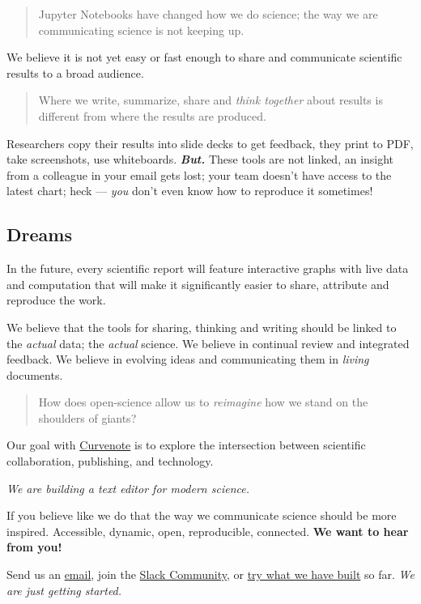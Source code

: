 \begin{quote}
  Jupyter Notebooks have changed how we do science; the way we are communicating science is not keeping up.
\end{quote}

We believe it is not yet easy or fast enough to share and communicate scientific results to a broad audience.

\begin{quote}
  Where we write, summarize, share and \textit{think together} about results is different from where the results are produced.
\end{quote}

Researchers copy their results into slide decks to get feedback, they print to PDF, take screenshots, use whiteboards. \textit{\textbf{But.}} These tools are not linked, an insight from a colleague in your email gets lost; your team doesn’t have access to the latest chart; heck — \textit{you} don’t even know how to reproduce it sometimes!

\subsection*{Dreams}

In the future, every scientific report will feature interactive graphs with live data and computation that will make it significantly easier to share, attribute and reproduce the work.

We believe that the tools for sharing, thinking and writing should be linked to the \textit{actual} data; the \textit{actual} science. We believe in continual review and integrated feedback. We believe in evolving ideas and communicating them in \textit{living} documents.

\begin{quote}
  How does open-science allow us to \textit{reimagine} how we stand on the shoulders of giants?
\end{quote}

Our goal with \href{https://curvenote.com}{Curvenote} is to explore the intersection between scientific collaboration, publishing, and technology.

\textit{We are building a text editor for modern science.}

If you believe like we do that the way we communicate science should be more inspired. Accessible, dynamic, open, reproducible, connected. \textbf{We want to hear from you!}

Send us an \href{mailto:hi@curvenote.com}{email}, join the \href{https://slack.curvenote.dev/}{Slack Community}, or \href{https://curvenote.com}{try what we have built} so far. \textit{We are just getting started.}
